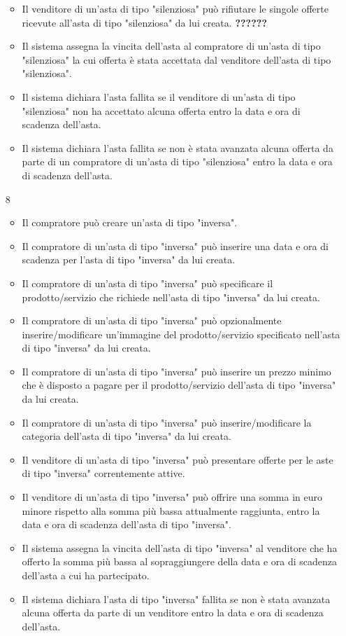 \begin{itemize}
\begin{itemize}
                    \item Il venditore di un'asta di tipo "silenziosa" può rifiutare le singole offerte ricevute all'asta di tipo "silenziosa" da lui creata. \textbf{??????}
                    \item Il sistema assegna la vincita dell'asta al compratore di un'asta di tipo "silenziosa" la cui offerta è stata accettata dal venditore dell'asta di tipo "silenziosa".
                    \item Il sistema dichiara l'asta fallita se il venditore di un'asta di tipo "silenziosa" non ha accettato alcuna offerta entro la data e ora di scadenza dell'asta.
                    \item Il sistema dichiara l'asta fallita se non è stata avanzata alcuna offerta da parte di un compratore di un'asta di tipo "silenziosa" entro la data e ora di scadenza dell'asta.
                \end{itemize}
            \item[8]
                \begin{itemize}            
                    \item Il compratore può creare un'asta di tipo "inversa".
                    \item Il compratore di un'asta di tipo "inversa" può inserire una data e ora di scadenza per l'asta di tipo "inversa" da lui creata.
                    \item Il compratore di un'asta di tipo "inversa" può specificare il prodotto/servizio che richiede nell'asta di tipo "inversa" da lui creata.
                    \item Il compratore di un'asta di tipo "inversa" può opzionalmente inserire/modificare un'immagine del prodotto/servizio specificato nell'asta di tipo "inversa" da lui creata.
                    \item Il compratore di un'asta di tipo "inversa" può inserire un prezzo minimo che è disposto a pagare per il prodotto/servizio dell'asta di tipo "inversa" da lui creata.
                    \item Il compratore di un'asta di tipo "inversa" può inserire/modificare la categoria dell'asta di tipo "inversa" da lui creata.
                    \item Il venditore di un'asta di tipo "inversa" può presentare offerte per le aste di tipo "inversa" correntemente attive.
                    \item Il venditore di un'asta di tipo "inversa" può offrire una somma in euro minore rispetto alla somma più bassa attualmente raggiunta, entro la data e ora di scadenza dell'asta di tipo "inversa".
                    \item Il sistema assegna la vincita dell'asta di tipo "inversa" al venditore che ha offerto la somma più bassa al sopraggiungere della data e ora di scadenza dell'asta a cui ha partecipato.
                    \item Il sistema dichiara l'asta di tipo "inversa" fallita se non è stata avanzata alcuna offerta da parte di un venditore entro la data e ora di scadenza dell'asta.
                \end{itemize}
        \end{itemize}